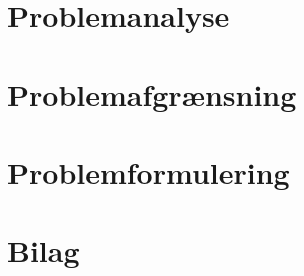 \documentclass[12pt,hidelinks]{article}
\begin{document}
	\section{Problemanalyse}
	
	
	
	
	
	
	
	
	
	\section{Problemafgrænsning}
    \section{Problemformulering}
    
    \newpage
    
	
	

    \section{Bilag}
    
    
\end{document}
